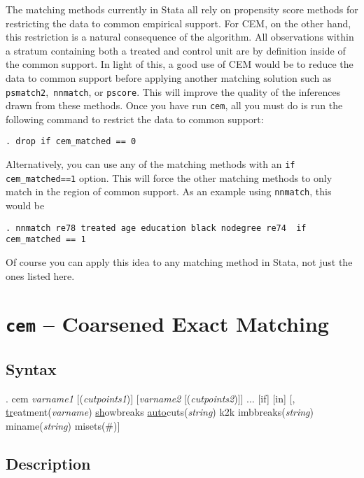 \documentclass[11pt,titlepage]{article}
\begin{document}
The matching methods currently in Stata all rely on propensity score
methods for restricting the data to common empirical support. For CEM, on
the other hand, this restriction is a natural consequence of the
algorithm. All observations within a stratum containing both a treated and
control unit are by definition inside of the common support. In light of
this, a good use of CEM would be to reduce the data to common support
before applying another matching solution such as
\texttt{psmatch2},\texttt{ nnmatch}, or \texttt{pscore}. This will improve
the quality of the inferences drawn from these methods. Once you have run
\texttt{cem}, all you must do is run the following command to restrict the
data to common support:

\begin{verbatim}
. drop if cem_matched == 0
\end{verbatim}

Alternatively, you can use any of the matching methods with an 
\texttt{if cem\_matched==1} option. This will force the other matching 
methods to only match in the region of common support. As an example using
\texttt{nnmatch}, this would be

\begin{verbatim}
. nnmatch re78 treated age education black nodegree re74  if cem_matched == 1
\end{verbatim}
Of course  you can apply this idea to any matching method in Stata, not
just the ones listed here. 

\section{\texttt{cem} -- Coarsened Exact Matching}

\subsection{Syntax}

.  cem {\it varname1} [({\it cutpoints1})] [{\it varname2}
    [({\it cutpoints2})]] ... [if] [in] [, 
    \underline{tr}eatment({\it varname}) \underline{sh}owbreaks 
    \underline{auto}cuts({\it string}) k2k imbbreaks({\it string}) 
    miname({\it string}) misets(\#)]

\subsection{Description}
\end{document}
